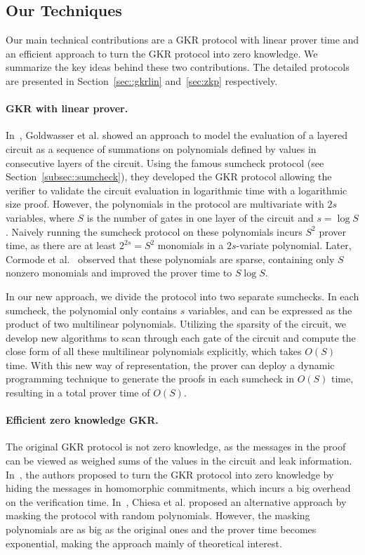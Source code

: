 \subsection{Our Techniques}
Our main technical contributions are a GKR protocol with linear prover time and an efficient approach to turn the GKR protocol into zero knowledge. We summarize the key ideas behind these two contributions. The detailed protocols are presented in Section~\ref{sec::gkrlin} and~\ref{sec:zkp} respectively.

\paragraph{GKR with linear prover.} In~\cite{GKR}, Goldwasser et al. showed an approach to model the evaluation of a layered circuit as a sequence of summations on polynomials defined by values in consecutive layers of the circuit. Using the famous sumcheck protocol (see Section~\ref{subsec::sumcheck}), they developed the GKR protocol allowing the verifier to validate the circuit evaluation in logarithmic time with a logarithmic size proof. However, the polynomials in the protocol are multivariate with $2s$ variables, where $S$ is the number of gates in one layer of the circuit and $s = \log S$. Naively running the sumcheck protocol on these polynomials incurs $S^2$ prover time, as there are at least $2^{2s}=S^2$ monomials in a $2s$-variate polynomial. Later, Cormode et al.~\cite{CMT} observed that these polynomials are sparse, containing only $S$ nonzero monomials and improved the prover time to $S\log S$.

In our new approach, we divide the protocol into two separate sumchecks. In each sumcheck, the polynomial only contains $s$ variables, and can be expressed as the product of two multilinear polynomials. Utilizing the sparsity of the circuit, we develop new algorithms to scan through each gate of the circuit and compute the close form of all these multilinear polynomials explicitly, which takes $O(S)$ time. With this new way of representation, the prover can deploy a dynamic programming technique to generate the proofs in each sumcheck in $O(S)$ time, resulting in a total prover time of $O(S)$. 

\paragraph{Efficient zero knowledge GKR.} The original GKR protocol is not zero knowledge, as the messages in the proof can be viewed as weighed sums of the values in the circuit and leak information. In~\cite{zkvpd,hyrax}, the authors proposed to turn the GKR protocol into zero knowledge by hiding the messages in homomorphic commitments, which incurs a big overhead on the verification time. In~\cite{zksumcheck}, Chiesa et al. proposed an alternative approach by masking the protocol with random polynomials. However, the masking polynomials are as big as the original ones and the prover time becomes exponential, making the approach mainly of theoretical interest. 

